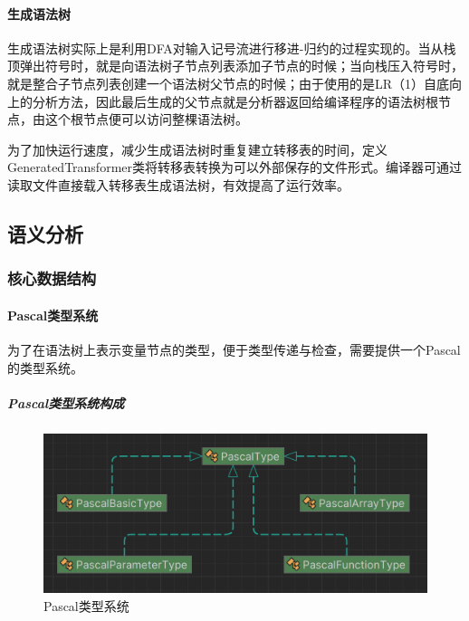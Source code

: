 \documentclass[../main.tex]{subfiles}
\begin{document}
\paragraph{生成语法树}

生成语法树实际上是利用DFA对输入记号流进行移进-归约的过程实现的。当从栈顶弹出符号时，就是向语法树子节点列表添加子节点的时候；当向栈压入符号时，就是整合子节点列表创建一个语法树父节点的时候；由于使用的是LR（1）自底向上的分析方法，因此最后生成的父节点就是分析器返回给编译程序的语法树根节点，由这个根节点便可以访问整棵语法树。

为了加快运行速度，减少生成语法树时重复建立转移表的时间，定义GeneratedTransformer类将转移表转换为可以外部保存的文件形式。编译器可通过读取文件直接载入转移表生成语法树，有效提高了运行效率。

\subsection{语义分析}

\subsubsection{核心数据结构}

\paragraph{Pascal类型系统}

为了在语法树上表示变量节点的类型，便于类型传递与检查，需要提供一个Pascal的类型系统。

\subparagraph{Pascal类型系统构成}
\begin{figure}[htbp]
\centering
\includegraphics[width=0.5\linewidth]{assets/类型系统.png}
\caption{Pascal类型系统}
\label{fig:类型系统}
\end{figure}
\end{document}
